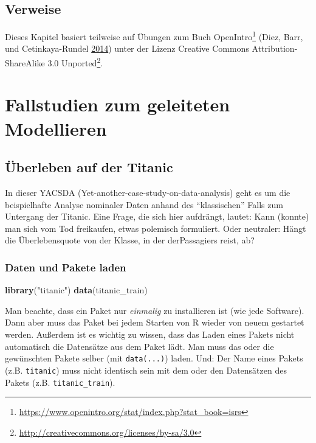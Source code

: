 \documentclass[12pt,ngerman,]{book}
\makeatletter
\newenvironment{Shaded}{\begin{snugshade}}{\end{snugshade}}
\newcommand{\KeywordTok}[1]{\textcolor[rgb]{0.13,0.29,0.53}{\textbf{{#1}}}}
\newcommand{\StringTok}[1]{\textcolor[rgb]{0.31,0.60,0.02}{{#1}}}
\newcommand{\NormalTok}[1]{{#1}}
\let\rmarkdownfootnote\footnote%
\def\footnote{\protect\rmarkdownfootnote}
\renewcommand{\href}[2]{#2\footnote{\url{#1}}}
\newenvironment{kframe}{%
\medskip{}
\setlength{\fboxsep}{.8em}
 \def\at@end@of@kframe{}%
 \ifinner\ifhmode%
  \def\at@end@of@kframe{\end{minipage}}%
  \begin{minipage}{\columnwidth}%
 \fi\fi%
 \def\FrameCommand##1{\hskip\@totalleftmargin \hskip-\fboxsep
 \colorbox{shadecolor}{##1}\hskip-\fboxsep
     \hskip-\linewidth \hskip-\@totalleftmargin \hskip\columnwidth}%
 \MakeFramed {\advance\hsize-\width
   \@totalleftmargin\z@ \linewidth\hsize
   \@setminipage}}%
 {\par\unskip\endMakeFramed%
 \at@end@of@kframe}
\renewenvironment{Shaded}{\begin{kframe}}{\end{kframe}}
\makeatother
\begin{document}
\section{Verweise}\label{verweise-6}

Dieses Kapitel basiert teilweise auf Übungen zum Buch
\href{https://www.openintro.org/stat/index.php?stat_book=isrs}{OpenIntro}
(Diez, Barr, und Cetinkaya-Rundel
\protect\hyperlink{ref-introstats}{2014}) unter der Lizenz
\href{http://creativecommons.org/licenses/by-sa/3.0}{Creative Commons
Attribution-ShareAlike 3.0 Unported}.

\chapter{Fallstudien zum geleiteten
Modellieren}\label{fallstudien-zum-geleiteten-modellieren}

\section{Überleben auf der Titanic}\label{uberleben-auf-der-titanic}

In dieser YACSDA (Yet-another-case-study-on-data-analysis) geht es um
die beispielhafte Analyse nominaler Daten anhand des ``klassischen''
Falls zum Untergang der Titanic. Eine Frage, die sich hier aufdrängt,
lautet: Kann (konnte) man sich vom Tod freikaufen, etwas polemisch
formuliert. Oder neutraler: Hängt die Überlebensquote von der Klasse, in
der derPassagiers reist, ab?

\subsection{Daten und Pakete laden}\label{daten-und-pakete-laden}

\begin{Shaded}
\begin{Highlighting}[]
\KeywordTok{library}\NormalTok{(}\StringTok{"titanic"}\NormalTok{)}
\KeywordTok{data}\NormalTok{(titanic_train)}
\end{Highlighting}
\end{Shaded}

Man beachte, dass ein Paket nur \emph{einmalig} zu installieren ist (wie
jede Software). Dann aber muss das Paket bei jedem Starten von R wieder
von neuem gestartet werden. Außerdem ist es wichtig zu wissen, dass das
Laden eines Pakets nicht automatisch die Datensätze aus dem Paket lädt.
Man muss das oder die gewünschten Pakete selber (mit \texttt{data(...)})
laden. Und: Der Name eines Pakets (z.B. \texttt{titanic}) muss nicht
identisch sein mit dem oder den Datensätzen des Pakets (z.B.
\texttt{titanic\_train}).
\end{document}
